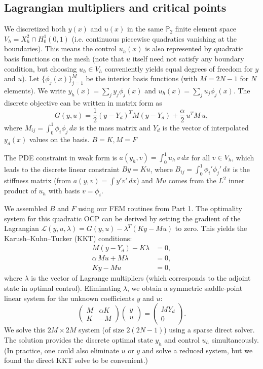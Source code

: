\documentclass[a4paper,10pt]{article}
\begin{document}
\subsection{Lagrangian multipliers and critical points}
We discretized both $y(x)$ and $u(x)$ in the same $\mathbb{P}_2$ finite element space $V_h = X_h^2 \cap H_0^1(0,1)$ (i.e. continuous piecewise quadratics vanishing at the boundaries). This means the control $u_h(x)$ is also represented by quadratic basis functions on the mesh (note that $u$ itself need not satisfy any boundary condition, but choosing $u_h\in V_h$ conveniently yields equal degrees of freedom for $y$ and $u$). Let $\{\phi_j(x)\}_{j=1}^{M}$ be the interior basis functions (with $M=2N-1$ for $N$ elements). We write $y_h(x)=\sum_j y_j\phi_j(x)$ and $u_h(x)=\sum_j u_j\phi_j(x)$. The discrete objective can be written in matrix form as
\[
	G(y,u) = \frac{1}{2}(y-Y_d)^T M(y-Y_d) + \frac{\alpha}{2}\,u^T M\,u,
\]
where $M_{ij}=\int_0^1 \phi_i\phi_j\,dx$ is the mass matrix and $Y_d$ is the vector of interpolated $y_d(x)$ values on the basis. $B = K, M = F$

The PDE constraint in weak form is $a(y_h,v) = \int_0^1 u_h\,v\,dx$ for all $v\in V_h$, which leads to the discrete linear constraint $By = Ku$, where $B_{ij}=\int_0^1 \phi_i'\phi_j'\,dx$ is the stiffness matrix (from $a(y,v)=\int y'v'\,dx$) and $Mu$ comes from the $L^2$ inner product of $u_h$ with basis $v=\phi_i$.

We assembled $B$ and $F$ using our FEM routines from Part 1. The optimality system for this quadratic OCP can be derived by setting the gradient of the Lagrangian $\mathcal{L}(y,u,\lambda) = G(y,u) - \lambda^T(Ky - Mu)$ to zero. This yields the Karush–Kuhn–Tucker (KKT) conditions:
\begin{align*}
	M(y-Y_d) - K\lambda   & = 0, \\
	\alpha\,Mu + M\lambda & = 0, \\
	Ky-Mu                 & = 0,
\end{align*}
where $\lambda$ is the vector of Lagrange multipliers (which corresponds to the adjoint state in optimal control). Eliminating $\lambda$, we obtain a symmetric saddle-point linear system for the unknown coefficients $y$ and $u$:
\[
	\begin{pmatrix}
		M & \alpha K \\
		K & -M
	\end{pmatrix}
	\begin{pmatrix}
		y \\
		u
	\end{pmatrix}
	=
	\begin{pmatrix}
		MY_d \\
		0
	\end{pmatrix}.
\]
We solve this $2M \times 2M$ system (of size $2(2N-1)$) using a sparse direct solver. The solution provides the discrete optimal state $y_h$ and control $u_h$ simultaneously. (In practice, one could also eliminate $u$ or $y$ and solve a reduced system, but we found the direct KKT solve to be convenient.)
\end{document}
